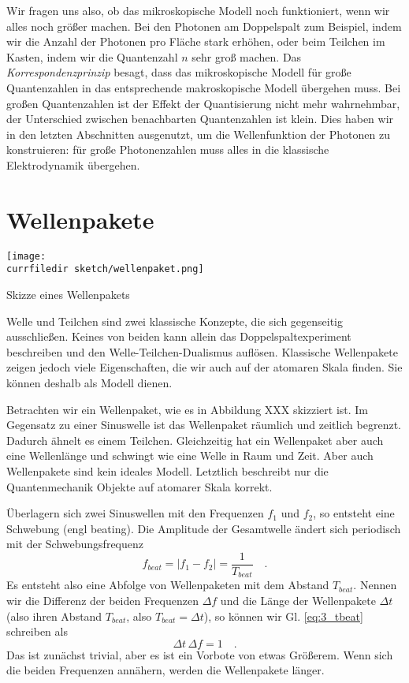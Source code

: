 Wir fragen uns also, ob das mikroskopische Modell noch funktioniert, wenn wir alles noch größer machen. Bei den Photonen am Doppelspalt zum Beispiel, indem wir die Anzahl der Photonen pro Fläche stark erhöhen, oder beim Teilchen im Kasten, indem wir die Quantenzahl $n$ sehr groß machen. Das \emph{Korrespondenzprinzip} besagt, dass das mikroskopische Modell für große Quantenzahlen in das entsprechende makroskopische Modell übergehen muss. Bei großen Quantenzahlen ist der Effekt der Quantisierung nicht mehr wahrnehmbar, der Unterschied zwischen benachbarten Quantenzahlen ist klein. Dies haben wir in den letzten Abschnitten ausgenutzt, um die Wellenfunktion der Photonen zu konstruieren: für große Photonenzahlen muss alles in die klassische Elektrodynamik übergehen.



\section{Wellenpakete}

\begin{marginfigure}
    \texttt{[image: \\currfiledir sketch/wellenpaket.png]}

    \caption{Skizze eines Wellenpakets}
\end{marginfigure}

Welle und Teilchen sind zwei klassische Konzepte, die sich gegenseitig ausschließen. Keines von beiden kann allein das Doppelspaltexperiment beschreiben und den Welle-Teilchen-Dualismus auflösen. Klassische Wellenpakete zeigen jedoch viele Eigenschaften, die wir auch auf der atomaren Skala finden. Sie können deshalb als Modell dienen.

Betrachten wir ein Wellenpaket, wie es in Abbildung XXX skizziert ist. Im Gegensatz zu einer Sinuswelle ist das Wellenpaket räumlich und zeitlich begrenzt. Dadurch ähnelt es einem Teilchen. Gleichzeitig hat ein Wellenpaket aber auch eine Wellenlänge und schwingt wie eine Welle in Raum und Zeit. Aber auch Wellenpakete sind kein ideales Modell. Letztlich beschreibt nur die Quantenmechanik Objekte auf atomarer Skala korrekt.

Überlagern sich zwei Sinuswellen mit den Frequenzen $f_1$ und $f_2$, so entsteht eine Schwebung (engl beating). Die Amplitude der Gesamtwelle ändert sich periodisch mit der Schwebungsfrequenz
\begin{equation}
    f_{beat} = | f_1 - f_2 | = \frac{1}{T_{beat}} \quad . \label{eq:3_tbeat}
\end{equation}
Es entsteht also eine Abfolge von Wellenpaketen mit dem Abstand $T_{beat}$. Nennen wir die Differenz der beiden Frequenzen $\Delta f$ und die Länge der Wellenpakete $\Delta t$ (also ihren Abstand $T_{beat}$, also $T_{beat} = \Delta t$), so können wir Gl. \ref{eq:3_tbeat} schreiben als
\begin{equation}
    \Delta t \, \Delta f = 1 \quad .
\end{equation}
Das ist zunächst trivial, aber es ist ein Vorbote von etwas Größerem. Wenn sich die beiden Frequenzen annähern, werden die Wellenpakete länger.

